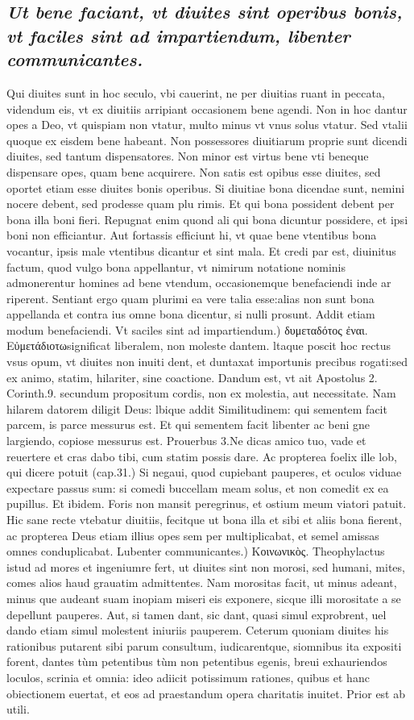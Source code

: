 \documentclass{article}
\begin{document}
\begin{pages}
\subsection*{\textit{Ut bene faciant, vt diuites sint operibus bonis, vt faciles sint ad impartiendum, libenter communicantes. }}\pstart Qui diuites sunt in hoc seculo, vbi cauerint, ne per diuitias ruant in peccata, videndum eis, vt ex diuitiis arripiant occasionem bene agendi. Non in hoc dantur opes a Deo, vt quispiam non vtatur, multo minus vt vnus solus vtatur. Sed vtalii quoque ex eisdem bene habeant. Non possessores diuitiarum proprie sunt dicendi diuites, sed tantum dispensatores. Non minor est virtus bene vti beneque dispensare opes, quam bene acquirere. Non satis est opibus esse diuites, sed oportet etiam esse diuites bonis operibus. Si diuitiae bona dicendae sunt, nemini nocere debent, sed prodesse quam plu rimis. Et qui bona possident debent per bona illa boni fieri. Repugnat enim quond ali qui bona dicuntur possidere, et ipsi boni non efficiantur. Aut fortassis efficiunt hi, vt quae bene vtentibus bona vocantur, ipsis male vtentibus dicantur et sint mala. Et credi par est, diuinitus factum, quod vulgo bona appellantur, vt nimirum notatione nominis admonerentur homines ad bene vtendum, occasionemque benefaciendi inde ar riperent. Sentiant ergo quam plurimi ea vere talia esse:alias non sunt bona appellanda et contra ius omne bona dicentur, si nulli prosunt. Addit etiam modum benefaciendi.  \pend\pstart Vt saciles sint ad impartiendum.) δυμεταδότος ἐναι. Εὐμετάδιοτωsignificat liberalem, non moleste dantem. ltaque poscit hoc rectus vsus opum, vt diuites non inuiti dent, et duntaxat importunis precibus rogati:sed ex animo, statim, hilariter, sine coactione. Dandum est, vt ait Apostolus 2. Corinth.9. secundum propositum cordis, non ex molestia, aut necessitate. Nam hilarem datorem diligit Deus: lbique addit Similitudinem: qui sementem facit parcem, is parce messurus est. Et qui sementem facit libenter ac beni gne largiendo, copiose messurus est. Prouerbus 3.Ne dicas amico tuo, vade et reuertere et cras dabo tibi, cum statim possis dare. Ac propterea foelix ille lob, qui dicere potuit (cap.31.) Si negaui, quod cupiebant pauperes, et oculos viduae expectare passus sum: si comedi buccellam meam solus, et non comedit ex ea pupillus. Et ibidem. Foris non mansit peregrinus, et ostium meum viatori patuit. Hic sane recte vtebatur diuitiis, fecitque ut bona illa et sibi et aliis bona fierent, ac propterea Deus etiam illius opes sem per multiplicabat, et semel amissas omnes conduplicabat.  \pend\pstart Lubenter communicantes.) Κοινωνικὸς. Theophylactus istud ad mores et ingeniumre fert, ut diuites sint non morosi, sed humani, mites, comes alios haud grauatim admittentes. Nam morositas facit, ut minus adeant, minus que audeant suam inopiam miseri eis exponere, sicque illi morositate a se depellunt pauperes. Aut, si tamen dant, sic dant, quasi simul exprobrent, uel dando etiam simul molestent iniuriis pauperem. Ceterum quoniam diuites his rationibus putarent sibi parum consultum, iudicarentque, siomnibus ita expositi forent, dantes tùm petentibus tùm non petentibus egenis, breui exhauriendos loculos, scrinia et omnia: ideo adiicit potissimum rationes, quibus et hanc obiectionem euertat, et eos ad praestandum opera charitatis inuitet. Prior est ab utili.  \pend

\end{pages}
\end{document}
